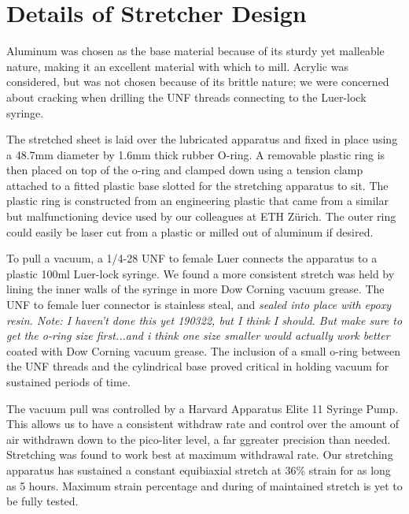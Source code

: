 \section{Details of Stretcher Design}

Aluminum was chosen as the base material because of its sturdy yet malleable nature, making it an excellent material with which to mill. Acrylic was considered, but was not chosen because of its brittle nature; we were concerned about cracking when drilling the UNF threads connecting to the Luer-lock syringe.

The stretched sheet is laid over the lubricated apparatus and fixed in place using a 48.7mm diameter by 1.6mm thick rubber O-ring. A removable plastic ring is then placed on top of the o-ring and clamped down using a tension clamp attached to a fitted plastic base slotted for the stretching apparatus to sit. The plastic ring is constructed from an engineering plastic that came from a similar but malfunctioning device used by our colleagues at ETH Zürich. The outer ring could easily be laser cut from a plastic or milled out of aluminum if desired. 

To pull a vacuum, a 1/4-28 UNF to female Luer connects the apparatus to a plastic 100ml Luer-lock syringe. We found a more consistent stretch was held by lining the inner walls of the syringe in more Dow Corning vacuum grease. The UNF to female luer connector is stainless steal, and \emph{sealed into place with epoxy resin. Note: I haven't done this yet 190322, but I think I should. But make sure to get the o-ring size first...and i think one size smaller would actually work better}
coated with Dow Corning vacuum grease. The inclusion of a small o-ring between the UNF threads and the cylindrical base proved critical in holding vacuum for sustained periods of time.

The vacuum pull was controlled by a Harvard Apparatus Elite 11 Syringe Pump. This allows us to have a consistent withdraw rate and control over the amount of air withdrawn down to the pico-liter level, a far ggreater precision than needed. Stretching was found to work best at maximum withdrawal rate. Our stretching apparatus has sustained a constant equibiaxial stretch at 36\% strain for as long as 5 hours. Maximum strain percentage and during of maintained stretch is yet to be fully tested.


